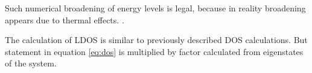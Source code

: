 Such numerical broadening of energy levels is legal, because in reality broadening appears due to thermal effects. \cite{temperature}.

The calculation of LDOS is similar to previously described DOS calculations. But statement in equation \ref{eq:dos} is multiplied by factor calculated from eigenstates of the system.